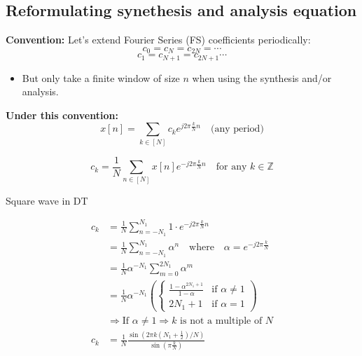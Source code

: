\subsection{Reformulating synethesis and analysis equation}
\begin{warning}
    \textbf{Convention:} Let's extend Fourier Series (FS) coefficients periodically:
    \[
    c_0 = c_N = c_{2N} = \cdots 
    \]
    \[
    c_1 = c_{N+1} = c_{2N+1} \cdots
    \]
    \begin{itemize}
        \item But only take a finite window of size \( n \) when using the synthesis and/or analysis. 
    \end{itemize}

    \textbf{Under this convention:}
    \[
    x[n] = \sum_{k \in [N]} c_k e^{j2\pi \frac{k}{N} n} \quad \text{(any period)}
    \]

    \[
    c_k = \frac{1}{N} \sum_{n \in [N]} x[n] e^{-j 2\pi \frac{k}{N} n} \quad \text{for any } k \in \mathbb{Z}
    \]
\end{warning}

\begin{example}
    Square wave in DT
    \vspace{1em}

    \begin{align*}
        c_k &= \frac{1}{N} \sum_{n=-N_1}^{N_1} 1 \cdot e^{-j 2\pi \frac{k}{N} n} \\
        &= \frac{1}{N} \sum_{n=-N_1}^{N_1} \alpha^n \quad \text{where} \quad \alpha = e^{-j 2\pi \frac{k}{N}} \\
        &= \frac{1}{N} \alpha^{-N_1} \sum_{m=0}^{2N_1} \alpha^m \\
        &= \frac{1}{N} \alpha^{-N_1} \left( 
        \begin{cases} 
            \frac{1 - \alpha^{2N_1+1}}{1 - \alpha} & \text{if } \alpha \neq 1 \\
            2N_1 + 1 & \text{if } \alpha = 1
        \end{cases}
        \right) \\
        &\Rightarrow \text{If } \alpha \neq 1 \Rightarrow k \text{ is not a multiple of } N \\
        c_k &= \frac{1}{N} \frac{\sin\left( 2\pi k \left( N_1 + \frac{1}{2} \right) / N \right)}{\sin\left( \pi \frac{k}{N} \right)}
    \end{align*}

\end{example}



